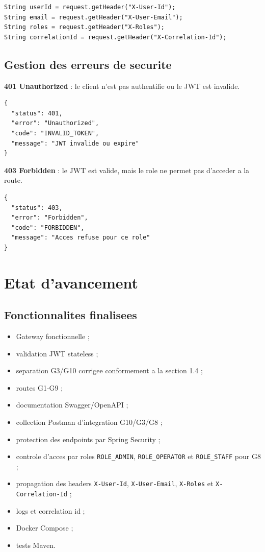 \documentclass[12pt, a4paper]{article}
\begin{document}
\begin{lstlisting}[style=codeStyle]
String userId = request.getHeader("X-User-Id");
String email = request.getHeader("X-User-Email");
String roles = request.getHeader("X-Roles");
String correlationId = request.getHeader("X-Correlation-Id");
\end{lstlisting}

\subsection{Gestion des erreurs de securite}

\textbf{401 Unauthorized} : le client n'est pas authentifie ou le JWT est invalide.

\begin{lstlisting}[style=codeStyle]
{
  "status": 401,
  "error": "Unauthorized",
  "code": "INVALID_TOKEN",
  "message": "JWT invalide ou expire"
}
\end{lstlisting}

\textbf{403 Forbidden} : le JWT est valide, mais le role ne permet pas d'acceder a la route.

\begin{lstlisting}[style=codeStyle]
{
  "status": 403,
  "error": "Forbidden",
  "code": "FORBIDDEN",
  "message": "Acces refuse pour ce role"
}
\end{lstlisting}

\section{Etat d'avancement}

\subsection{Fonctionnalites finalisees}

\begin{itemize}
  \item Gateway fonctionnelle ;
  \item validation JWT stateless ;
  \item separation G3/G10 corrigee conformement a la section 1.4 ;
  \item routes G1-G9 ;
  \item documentation Swagger/OpenAPI ;
  \item collection Postman d'integration G10/G3/G8 ;
  \item protection des endpoints par Spring Security ;
  \item controle d'acces par roles \texttt{ROLE\_ADMIN}, \texttt{ROLE\_OPERATOR} et \texttt{ROLE\_STAFF} pour G8 ;
  \item propagation des headers \texttt{X-User-Id}, \texttt{X-User-Email}, \texttt{X-Roles} et \texttt{X-Correlation-Id} ;
  \item logs et correlation id ;
  \item Docker Compose ;
  \item tests Maven.
\end{itemize}
\end{document}
